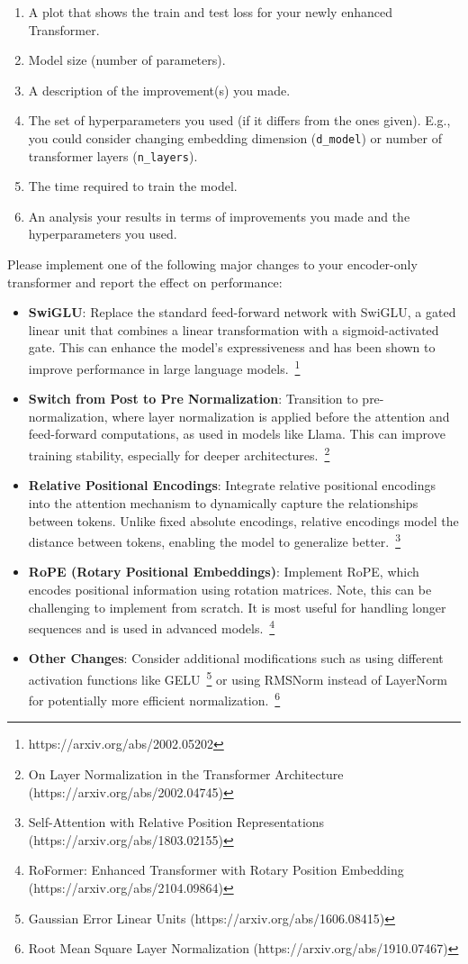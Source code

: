\begin{enumerate}
    \begin{enumerate}[label=(\alph*)]
        \item A plot that shows the train and test loss for your newly enhanced Transformer.
        \item Model size (number of parameters).
        \item A description of the improvement(s) you made. 
        \item The set of hyperparameters you used (if it differs from the ones given). E.g., you could consider changing embedding dimension (\verb|d_model|) or number of transformer layers (\verb|n_layers|).
        \item The time required to train the model.
        \item An analysis your results in terms of improvements you made and the hyperparameters you used.
    \end{enumerate}

    Please implement one of the following major changes to your encoder-only transformer and report the effect on performance:
    \begin{itemize}
    \item \textbf{SwiGLU}: Replace the standard feed-forward network with SwiGLU, a gated linear unit that combines a linear transformation with a sigmoid-activated gate. This can enhance the model's expressiveness and has been shown to improve performance in large language models.~\footnote{https://arxiv.org/abs/2002.05202}
    \item \textbf{Switch from Post to Pre Normalization}: Transition to pre-normalization, where layer normalization is applied before the attention and feed-forward computations, as used in models like Llama. This can improve training stability, especially for deeper architectures.~\footnote{On Layer Normalization in the Transformer Architecture
 (https://arxiv.org/abs/2002.04745)}
    \item \textbf{Relative Positional Encodings}: Integrate relative positional encodings into the attention mechanism to dynamically capture the relationships between tokens. Unlike fixed absolute encodings, relative encodings model the distance between tokens, enabling the model to generalize better.~\footnote{Self-Attention with Relative Position Representations (https://arxiv.org/abs/1803.02155)}
    \item \textbf{RoPE (Rotary Positional Embeddings)}: Implement RoPE, which encodes positional information using rotation matrices. Note, this can be challenging to implement from scratch. It is most useful for handling longer sequences and is used in advanced models.~\footnote{RoFormer: Enhanced Transformer with Rotary Position Embedding (https://arxiv.org/abs/2104.09864)}
    \item \textbf{Other Changes}: Consider additional modifications such as using different activation functions like GELU~\footnote{Gaussian Error Linear Units (https://arxiv.org/abs/1606.08415)} or using RMSNorm instead of LayerNorm for potentially more efficient normalization.~\footnote{Root Mean Square Layer Normalization
 (https://arxiv.org/abs/1910.07467)}
    \end{itemize}
    


\end{enumerate}
